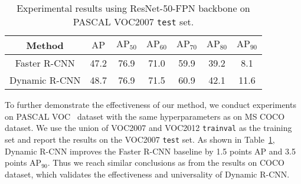 \documentclass[runningheads]{llncs}
\begin{document}
\begin{table}[!h]
    \caption{Experimental results using ResNet-50-FPN backbone on PASCAL VOC2007 \texttt{test} set.}
    \label{tab:sup_voc}
    \begin{center}
\setlength{\tabcolsep}{4pt}
\begin{tabular}{ccccccc}
\toprule
Method & $\mathrm{AP}$ & $\mathrm{AP}_{50}$ & $\mathrm{AP}_{60}$ & $\mathrm{AP}_{70}$ & $\mathrm{AP}_{80}$ & $\mathrm{AP}_{90}$\\
\midrule
Faster R-CNN & 47.2 & 76.9 & 71.0 & 59.9 & 39.2 & 8.1\\
Dynamic R-CNN & 48.7 & 76.9 & 71.5 & 60.9 & 42.1 & 11.6\\
\bottomrule
\end{tabular}
\end{center}
 \end{table}

To further demonstrate the effectiveness of our method, we conduct experiments on PASCAL VOC~\cite{PASCAL-VOC} dataset with the same hyperparameters as on MS COCO dataset. We use the union of VOC2007 and VOC2012 \texttt{trainval} as the training set and report the results on the VOC2007 \texttt{test} set. As shown in Table~\ref{tab:sup_voc}, Dynamic R-CNN improves the Faster R-CNN baseline by 1.5 points $\mathrm{AP}$ and 3.5 points $\mathrm{AP_{90}}$. Thus we reach similar conclusions as from the results on COCO dataset, which validates the effectiveness and universality of Dynamic R-CNN.
\end{document}
